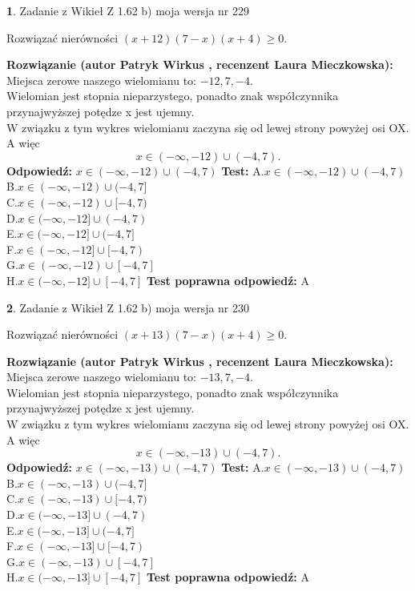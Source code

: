 \documentclass[12pt, a4paper]{article}
\theoremstyle{definition} %
\newtheorem{zad}{}
\newcommand{\zadStart}[1]{\begin{zad}#1\newline}
\newcommand{\zadStop}{\end{zad}}
\newcommand{\rozwStart}[2]{\noindent \textbf{Rozwiązanie (autor #1 , recenzent #2): }\newline}
\newcommand{\rozwStop}{\newline}
\newcommand{\odpStart}{\noindent \textbf{Odpowiedź:}\newline}
\newcommand{\odpStop}{\newline}
\newcommand{\testStart}{\noindent \textbf{Test:}\newline}
\newcommand{\testStop}{\newline}
\newcommand{\kluczStart}{\noindent \textbf{Test poprawna odpowiedź:}\newline}
\newcommand{\kluczStop}{\newline}
\begin{document}
\zadStart{Zadanie z Wikieł Z 1.62 b) moja wersja nr 229}

Rozwiązać nierówności $(x+12)(7-x)(x+4)\ge0$.
\zadStop
\rozwStart{Patryk Wirkus}{Laura Mieczkowska}
Miejsca zerowe naszego wielomianu to: $-12, 7, -4$.\\
Wielomian jest stopnia nieparzystego, ponadto znak współczynnika przy\linebreak najwyższej potędze x jest ujemny.\\ W związku z tym wykres wielomianu zaczyna się od lewej strony powyżej osi OX. A więc $$x \in (-\infty,-12) \cup (-4,7).$$
\rozwStop
\odpStart
$x \in (-\infty,-12) \cup (-4,7)$
\odpStop
\testStart
A.$x \in (-\infty,-12) \cup (-4,7)$\\
B.$x \in (-\infty,-12) \cup (-4,7]$\\
C.$x \in (-\infty,-12) \cup [-4,7)$\\
D.$x \in (-\infty,-12] \cup (-4,7)$\\
E.$x \in (-\infty,-12] \cup (-4,7]$\\
F.$x \in (-\infty,-12] \cup [-4,7)$\\
G.$x \in (-\infty,-12) \cup [-4,7]$\\
H.$x \in (-\infty,-12] \cup [-4,7]$
\testStop
\kluczStart
A
\kluczStop



\zadStart{Zadanie z Wikieł Z 1.62 b) moja wersja nr 230}

Rozwiązać nierówności $(x+13)(7-x)(x+4)\ge0$.
\zadStop
\rozwStart{Patryk Wirkus}{Laura Mieczkowska}
Miejsca zerowe naszego wielomianu to: $-13, 7, -4$.\\
Wielomian jest stopnia nieparzystego, ponadto znak współczynnika przy\linebreak najwyższej potędze x jest ujemny.\\ W związku z tym wykres wielomianu zaczyna się od lewej strony powyżej osi OX. A więc $$x \in (-\infty,-13) \cup (-4,7).$$
\rozwStop
\odpStart
$x \in (-\infty,-13) \cup (-4,7)$
\odpStop
\testStart
A.$x \in (-\infty,-13) \cup (-4,7)$\\
B.$x \in (-\infty,-13) \cup (-4,7]$\\
C.$x \in (-\infty,-13) \cup [-4,7)$\\
D.$x \in (-\infty,-13] \cup (-4,7)$\\
E.$x \in (-\infty,-13] \cup (-4,7]$\\
F.$x \in (-\infty,-13] \cup [-4,7)$\\
G.$x \in (-\infty,-13) \cup [-4,7]$\\
H.$x \in (-\infty,-13] \cup [-4,7]$
\testStop
\kluczStart
A
\kluczStop
\end{document}
